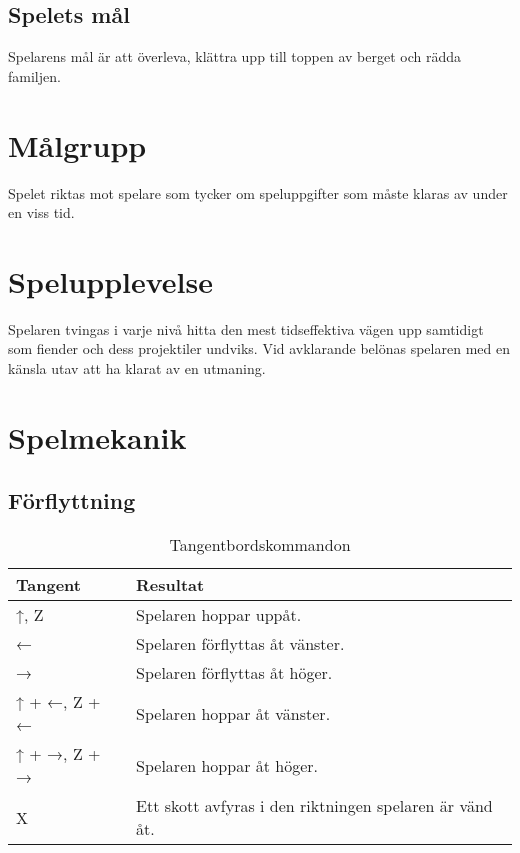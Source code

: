\documentclass{TDP005mall}
\begin{document}
\subsection{Spelets mål}
Spelarens mål är att överleva, klättra upp till toppen av berget och rädda familjen.

\section{Målgrupp}%
Spelet riktas mot spelare som tycker om speluppgifter som måste klaras av under en viss tid.

\section{Spelupplevelse}%
Spelaren tvingas i varje nivå hitta den mest tidseffektiva vägen upp samtidigt som fiender och dess projektiler undviks. Vid avklarande belönas spelaren med en känsla utav att ha klarat av en utmaning.  

\section{Spelmekanik}%


\subsection{Förflyttning}

\begin{table}[!h]
  \caption{Tangentbordskommandon\label{tab}}
\begin{tabularx}{\linewidth}{|l|l|}
\hline
Tangent & Resultat \\\hline
↑, Z & Spelaren hoppar uppåt. \\\hline
← & Spelaren förflyttas åt vänster. \\\hline
→ & Spelaren förflyttas åt höger. \\\hline
↑ + ←, Z + ← & Spelaren hoppar åt vänster. \\\hline
↑ + →, Z + → & Spelaren hoppar åt höger. \\\hline
X & Ett skott avfyras i den riktningen spelaren är vänd åt. \\\hline
\end{tabularx}
\end{table}
\end{document}
